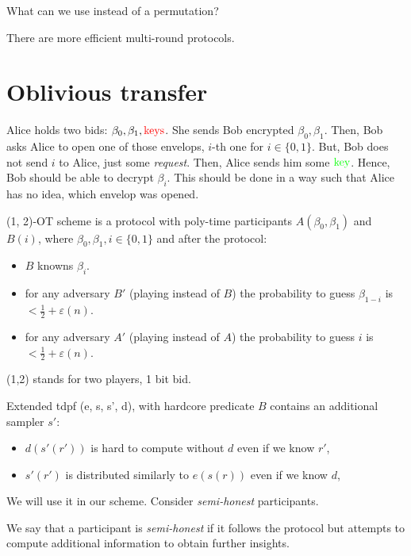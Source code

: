 \begin{exercise}
    What can we use instead of a permutation?
\end{exercise}

\begin{remark}
    There are more efficient multi-round protocols.
\end{remark}

\section{Oblivious transfer}

Alice holds two bids: $\beta_0, \beta_1, \textcolor{red}{\text{keys}}$.
She sends Bob encrypted $\beta_0, \beta_1$.
Then, Bob asks Alice to open one of those envelops, $i$-th one for $i \in \{0, 1\}$.
But, Bob does not send $i$ to Alice, just some \textit{request}.
Then, Alice sends him some $\textcolor{green}{\text{key}}$.
Hence, Bob should be able to decrypt $\beta_i$.
This should be done in a way such that Alice has no idea, which envelop was opened.

\begin{definition}[(1,2)-OT]
    (1, 2)-OT scheme is a protocol with poly-time participants $A(\beta_0, \beta_1)$ and $B(i)$, where $\beta_0, \beta_1, i \in \{0, 1\}$ and after the protocol:
    \begin{itemize}
        \item $B$ knowns $\beta_i$.
	\item for any adversary $B'$ (playing instead of $B$) the probability to guess $\beta_{1 - i}$ is $< \frac{1}{2} + \varepsilon(n)$.
	\item for any adversary $A'$ (playing instead of $A$) the probability to guess $i$ is $< \frac{1}{2} + \varepsilon(n)$.
    \end{itemize}
\end{definition}
(1,2) stands for two players, 1 bit bid.

\begin{definition}
    Extended tdpf (e, s, s', d), with hardcore predicate $B$ contains an additional sampler $s'$:
    \begin{itemize}
        \item $d(s'(r'))$ is hard to compute without $d$ even if we know $r'$,
	\item $s'(r')$ is distributed similarly to $e(s(r))$ even if we know $d$,
    \end{itemize}
\end{definition}
We will use it in our scheme.
Consider \emph{semi-honest} participants.
\begin{definition} \label{df:semi_honest}
    We say that a participant is \emph{semi-honest} if it follows the protocol but attempts to compute additional information to obtain further insights.
\end{definition}

